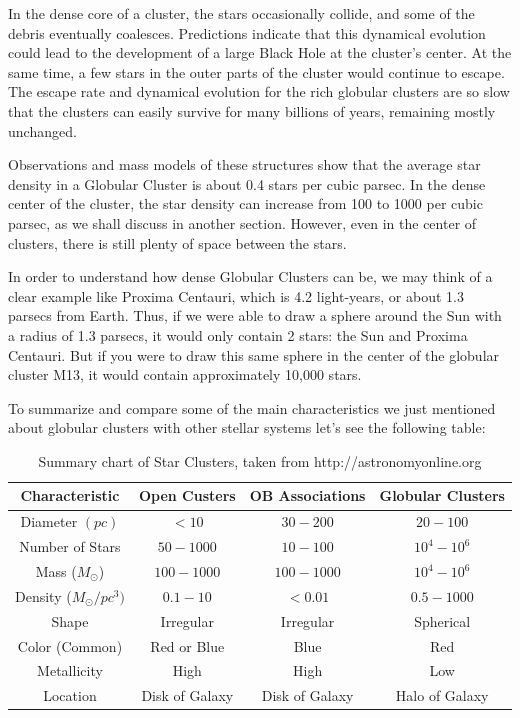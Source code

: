 In the dense core of a cluster, the stars occasionally collide, and some of the debris eventually coalesces. Predictions indicate that this dynamical evolution could lead to the development of a large Black Hole at the cluster's center. At the same time, a few stars in the outer parts of the cluster would continue to escape. The escape rate and dynamical evolution for the rich globular clusters are so slow that the clusters can easily survive for many billions of years, remaining mostly unchanged.

Observations and mass models of these structures show that the average star density in a Globular Cluster is about 0.4 stars per cubic parsec. In the dense center of the cluster, the star density can increase from 100 to 1000 per cubic parsec, as we shall discuss in another section. However, even in the center of clusters, there is still plenty of space between the stars.

In order to understand how dense Globular Clusters can be, we may think of a clear example like Proxima Centauri, which is 4.2 light-years, or about 1.3 parsecs from Earth. Thus, if we were able to draw a sphere around the Sun with a radius of 1.3 parsecs, it would only contain 2 stars: the Sun and Proxima Centauri. But if you were to draw this same sphere in the center of the globular cluster M13, it would contain approximately 10,000 stars.

To summarize and compare some of the main characteristics we just mentioned about globular clusters with other stellar systems let's see the following table:

\begin{table}[H]
\begin{tabular}{| c | c | c | c |}
\hline
\textbf{Characteristic}              & \textbf{Open Custers} & \textbf{OB Associations} & \textbf{Globular Clusters}  \\
\hline
Diameter $ (pc) $ & $<10$ & $30-200$ & $20-100$ \\ \hline
Number of Stars & $50-1000$ & $10-100$ & $10^{4}-10^{6}$ \\ \hline
Mass ($M_{\odot}$) & $100-1000$ & $100-1000$ & $10^{4}-10^{6}$ \\ \hline
Density ($M_{\odot}/pc^{3})$ & $0.1-10$ & $<0.01$ & $0.5-1000$ \\ \hline
Shape & Irregular & Irregular & Spherical \\ \hline
Color (Common) & Red or Blue & Blue & Red \\ \hline
Metallicity & High & High & Low \\ \hline
Location & Disk of Galaxy & Disk of Galaxy & Halo of Galaxy \\
\hline
\end{tabular}
\caption[Summary chart of Star Clusters]{Summary chart of Star Clusters, taken from  http://astronomyonline.org}
\end{table}

